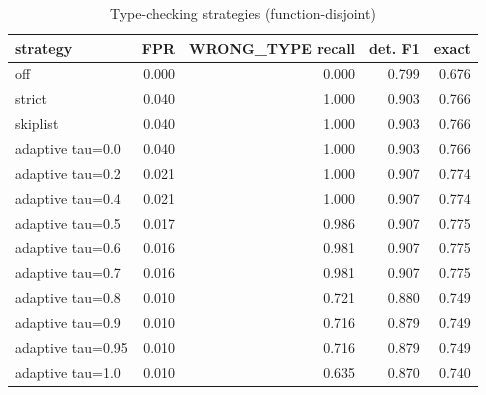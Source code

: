 \begin{table}[t]
\centering
\caption{Type-checking strategies (function-disjoint)}
\label{tab:type_strategies_function_disjoint}
\begin{tabular}{lrrrr}
\hline
strategy & FPR & WRONG\_TYPE recall & det. F1 & exact \\
\hline
off & 0.000 & 0.000 & 0.799 & 0.676 \\
strict & 0.040 & 1.000 & 0.903 & 0.766 \\
skiplist & 0.040 & 1.000 & 0.903 & 0.766 \\
adaptive tau=0.0 & 0.040 & 1.000 & 0.903 & 0.766 \\
adaptive tau=0.2 & 0.021 & 1.000 & 0.907 & 0.774 \\
adaptive tau=0.4 & 0.021 & 1.000 & 0.907 & 0.774 \\
adaptive tau=0.5 & 0.017 & 0.986 & 0.907 & 0.775 \\
adaptive tau=0.6 & 0.016 & 0.981 & 0.907 & 0.775 \\
adaptive tau=0.7 & 0.016 & 0.981 & 0.907 & 0.775 \\
adaptive tau=0.8 & 0.010 & 0.721 & 0.880 & 0.749 \\
adaptive tau=0.9 & 0.010 & 0.716 & 0.879 & 0.749 \\
adaptive tau=0.95 & 0.010 & 0.716 & 0.879 & 0.749 \\
adaptive tau=1.0 & 0.010 & 0.635 & 0.870 & 0.740 \\
\hline
\end{tabular}
\end{table}
